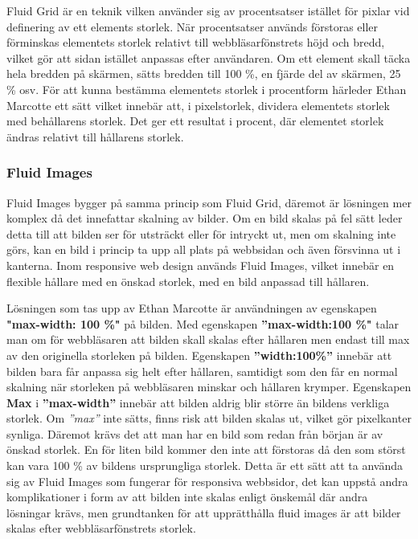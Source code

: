 \documentclass[11pt]{article}
\begin{document}
Fluid Grid är en teknik vilken använder sig av procentsatser istället för pixlar vid definering av ett elements storlek. När procentsatser används förstoras eller förminskas elementets storlek relativt till webbläsarfönstrets höjd och bredd, vilket gör att sidan istället anpassas efter användaren. Om ett element skall täcka hela bredden på skärmen, sätts bredden till 100 \%, en fjärde del av skärmen, 25 \% osv. 
För att kunna bestämma elementets storlek i procentform härleder Ethan Marcotte ett sätt vilket innebär att, i pixelstorlek, dividera elementets storlek med behållarens storlek. Det ger ett resultat i procent, där elementet storlek ändras relativt till hållarens storlek.

\subsubsection{Fluid Images}
Fluid Images bygger på samma princip som Fluid Grid, däremot är lösningen mer komplex då det innefattar skalning av bilder. Om en bild skalas på fel sätt leder detta till att bilden ser för utsträckt eller för intryckt ut, men om skalning inte görs, kan en bild i princip ta upp all plats på webbsidan och även försvinna ut i kanterna. Inom responsive web design används Fluid Images, vilket innebär en flexible hållare med en önskad storlek, med en bild anpassad till hållaren.  

Lösningen som tas upp av Ethan Marcotte är användningen av egenskapen \textbf{"max-width: 100 \%"} på bilden. Med egenskapen \textbf{”max-width:100 \%"}  talar man om för webbläsaren att bilden skall skalas efter hållaren men endast till max av den originella storleken på bilden. Egenskapen \textbf{”width:100\%”} innebär att bilden bara får anpassa sig helt efter hållaren, samtidigt som den får en normal skalning när storleken på webbläsaren minskar och hållaren krymper. Egenskapen \textbf{Max} i \textbf{”max-width”} innebär att bilden aldrig blir större än bildens verkliga storlek. Om \textit{”max”} inte sätts, finns risk att bilden skalas ut, vilket gör pixelkanter synliga. Däremot krävs det att man har en bild som redan från början är av önskad storlek. En för liten bild kommer den inte att förstoras då den som störst kan vara 100 \% av bildens ursprungliga storlek. Detta är ett sätt att ta använda sig av Fluid Images som fungerar för responsiva webbsidor, det kan uppstå andra komplikationer i form av att bilden inte skalas enligt önskemål där andra lösningar krävs, men grundtanken för att upprätthålla fluid images är att bilder skalas efter webbläsarfönstrets storlek.
\end{document}
